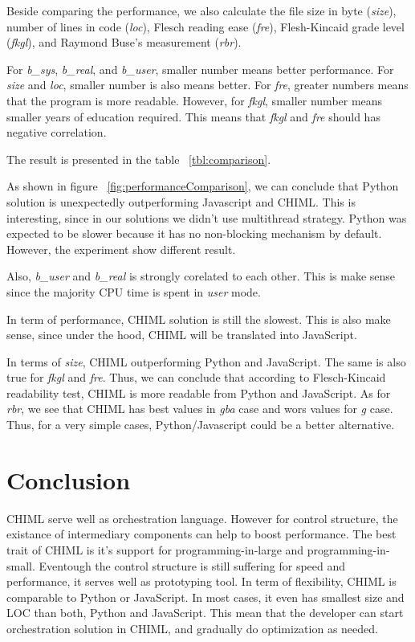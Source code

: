 \documentclass[conference]{IEEEtran}
\begin{document}
Beside comparing the performance, we also calculate the file size in byte ({\it size}), number of lines in code ({\it loc}), Flesch reading ease ({\it fre}), Flesh-Kincaid grade level ({\it fkgl}), and Raymond Buse's measurement ({\it rbr}).

For {\it b\_sys}, {\it b\_real}, and {\it b\_user}, smaller number means better performance. For {\it size} and {\it loc}, smaller number is also means better. For {\it fre}, greater numbers means that the program is more readable. However, for {\it fkgl}, smaller number means smaller years of education required. This means that {\it fkgl} and {\it fre} should has negative correlation.

The result is presented in the table ~\ref{tbl:comparison}.

As shown in figure ~\ref{fig:performanceComparison}, we can conclude that Python solution is unexpectedly outperforming Javascript and CHIML. This is interesting, since in our solutions we didn't use multithread strategy. Python was expected to be slower because it has no non-blocking mechanism by default. However, the experiment show different result.

Also, {\it b\_user} and {\it b\_real} is strongly corelated to each other. This is make sense since the majority CPU time is spent in {\it user} mode.

In term of performance, CHIML solution is still the slowest. This is also make sense, since under the hood, CHIML will be translated into JavaScript. 

In terms of {\it size}, CHIML outperforming Python and JavaScript. The same is also true for {\it fkgl} and {\it fre}. Thus, we can conclude that according to Flesch-Kincaid readability test, CHIML is more readable from Python and JavaScript. As for {\it rbr}, we see that CHIML has best values in {\it gba} case and wors values for {\it g} case. Thus, for a very simple cases, Python/Javascript could be a better alternative.

\section{Conclusion}

CHIML serve well as orchestration language. However for control structure, the existance of intermediary components can help to boost performance. The best trait of CHIML is it's support for programming-in-large and programming-in-small. Eventough the control structure is still suffering for speed and performance, it serves well as prototyping tool. In term of flexibility, CHIML is comparable to Python or JavaScript. In most cases, it even has smallest size and LOC than both, Python and JavaScript. This mean that the developer can start orchestration solution in CHIML, and gradually do optimization as needed.
\end{document}

